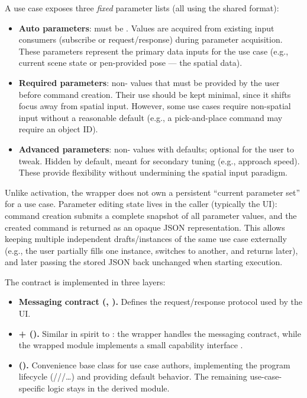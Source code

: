A use case exposes three \emph{fixed} parameter lists (all using the shared  format):
\begin{itemize}
    \item \textbf{Auto parameters}: must be . Values are acquired from existing input consumers (subscribe or request/response) during parameter acquisition. These parameters represent the primary data inputs for the use case (e.g., current scene state or pen-provided pose --- the spatial data).
    \item \textbf{Required parameters}: non- values that must be provided by the user before command creation. Their use should be kept minimal, since it shifts focus away from spatial input. However, some use cases require non-spatial input without a reasonable default (e.g., a pick-and-place command may require an object ID).
    \item \textbf{Advanced parameters}: non- values with defaults; optional for the user to tweak. Hidden by default, meant for secondary tuning (e.g., approach speed). These provide flexibility without undermining the spatial input paradigm.
\end{itemize}

Unlike activation, the wrapper does not own a persistent ``current parameter set'' for a use case. Parameter editing state lives in the caller (typically the UI): command creation submits a complete snapshot of all parameter values, and the created command is returned as an opaque JSON representation. This allows keeping multiple independent drafts/instances of the same use case externally (e.g., the user partially fills one instance, switches to another, and returns later), and later passing the stored JSON back unchanged when starting execution.

The contract is implemented in three layers:
\begin{itemize}
    \item \textbf{Messaging contract (, ).} Defines the request/response protocol used by the UI.
    \item \textbf{ +  ().} Similar in spirit to : the wrapper handles the messaging contract, while the wrapped module implements a small capability interface .
    \item \textbf{ ().} Convenience base class for use case authors, implementing the program lifecycle (///\dots) and providing default  behavior. The remaining use-case-specific logic stays in the derived module.
\end{itemize}

